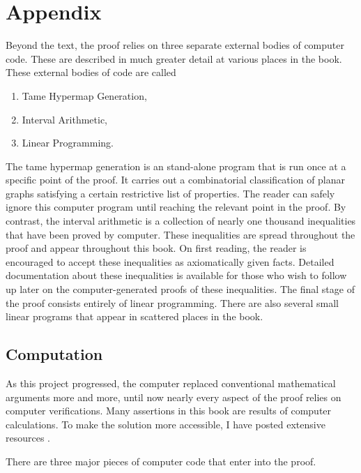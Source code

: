 \chapter{Appendix}

Beyond the text,
the proof relies on three separate external bodies of computer code.  These are described in much greater detail at various places in the book.  These external bodies of code are called
\begin{enumerate}
\item Tame Hypermap Generation,
\item Interval Arithmetic,
\item Linear Programming.
\end{enumerate}
The tame hypermap generation is an stand-alone program that is run once at a specific point of the proof.  It carries out a combinatorial classification of planar graphs satisfying a certain restrictive list of properties.  The reader can safely ignore this computer program until reaching the relevant point in the proof.   By contrast, the interval arithmetic is a collection of nearly one thousand inequalities that have been proved by computer.   These inequalities are spread throughout the proof and appear throughout this book.  On first reading, the reader is encouraged to accept these inequalities as axiomatically given facts.   Detailed documentation about these inequalities is available for those who wish to follow up later on the computer-generated proofs of these inequalities.  The final stage of the proof consists entirely of linear programming.  There are also several small linear programs that appear in scattered places in the book.

\section{Computation}

As this project  progressed, the computer  replaced conventional
mathematical arguments more and more, until now
 nearly every aspect of the proof relies on
computer verifications.  Many assertions in this book
 are results of computer calculations.
To make the solution more accessible, I have
posted extensive resources \cite{web}.

There are three major pieces of computer code that enter into the proof.

